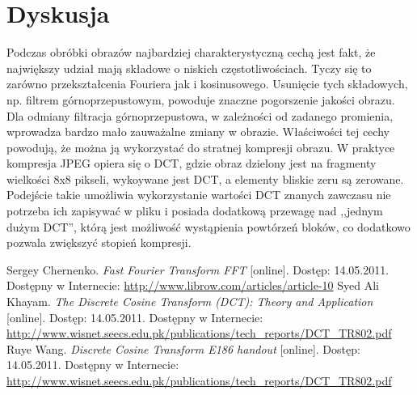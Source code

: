 \documentclass{classrep}
\begin{document}
\section{Dyskusja}
Podczas obróbki obrazów najbardziej charakterystyczną cechą jest fakt, że największy udział mają składowe o niskich częstotliwościach. Tyczy się to zarówno przekształcenia Fouriera jak i kosinusowego. Usunięcie tych składowych, np. filtrem górnoprzepustowym, powoduje znaczne pogorszenie jakości obrazu. Dla odmiany filtracja górnoprzepustowa, w zależności od zadanego promienia, wprowadza bardzo mało zauważalne zmiany w obrazie. Właściwości tej cechy powodują, że można ją wykorzystać do stratnej kompresji obrazu. W praktyce kompresja JPEG opiera się o DCT, gdzie obraz dzielony jest na fragmenty wielkości 8x8 pikseli, wykoywane jest DCT, a elementy bliskie zeru są zerowane. Podejście takie umożliwia wykorzystanie wartości DCT znanych zawczasu \ppauza nie potrzeba ich zapisywać w pliku i posiada dodatkową przewagę nad ,,jednym dużym DCT'', którą jest możliwość wystąpienia powtórzeń bloków, co dodatkowo pozwala zwiększyć stopień kompresji.

\begin{thebibliography}{9}
 Sergey Chernenko. \textit{Fast Fourier Transform \ppauza FFT} [online]. Dostęp: 14.05.2011. Dostępny w Internecie: \url{http://www.librow.com/articles/article-10}
 Syed Ali Khayam. \textit{The Discrete Cosine Transform (DCT): Theory and Application} [online]. Dostęp: 14.05.2011. Dostępny w Internecie: \url{http://www.wisnet.seecs.edu.pk/publications/tech_reports/DCT_TR802.pdf}
 Ruye Wang. \textit{Discrete Cosine Transform \ppauza E186 handout} [online]. Dostęp: 14.05.2011. Dostępny w Internecie: \url{http://www.wisnet.seecs.edu.pk/publications/tech_reports/DCT_TR802.pdf}
\end{thebibliography}
\end{document}
